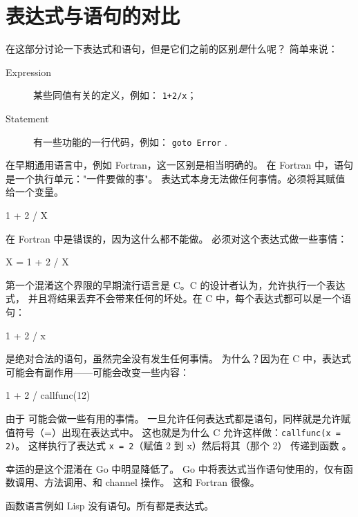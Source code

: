 \section{表达式与语句的对比}
\label{sec:expression versus statement}
在这部分讨论一下表达式和语句，但是它们之前的区别\emph{是}什么呢？
简单来说：
\begin{description}
\item[Expression] 某些同值有关的定义，例如：
\lstinline{1+2/x}；
\item[Statement] 有一些功能的一行代码，例如：
\lstinline{goto Error} .
\end{description}

在早期通用语言中，例如 Fortran，这一区别是相当明确的。
在 Fortran 中，语句是一个执行单元："一件要做的事"。 
表达式本身无法做任何事情。必须将其赋值给一个变量。
\begin{display}
1 + 2 / X
\end{display}
在 Fortran 中是错误的，因为这什么都不能做。
必须对这个表达式做一些事情：
\begin{display}{X = 1 + 2 / X}\end{display}

第一个混淆这个界限的早期流行语言是 C。C 的设计者认为，允许执行一个表达式，
并且将结果丢弃不会带来任何的坏处。在 C 中，每个表达式都可以是一个语句：
\begin{display}1 + 2 / x\end{display}
是绝对合法的语句，虽然完全没有发生任何事情。
为什么？因为在 C 中，表达式可能会有副作用——可能会改变一些内容：
\begin{display}{1 + 2 / callfunc(12)}\end{display}

由于  可能会做一些有用的事情。
一旦允许任何表达式都是语句，同样就是允许赋值符号（=）出现在表达式中。
这也就是为什么 C 允许这样做：\lstinline{callfunc(x = 2)}。
这样执行了表达式 \lstinline{x = 2}（赋值 2 到 x）然后将其（那个 2）
传递到函数 。

幸运的是这个混淆在 Go 中明显降低了。
Go 中将表达式当作语句使用的，仅有函数调用、方法调用、和 channel 操作。
这和 Fortran 很像。

函数语言例如 Lisp 没有语句。所有都是表达式。
